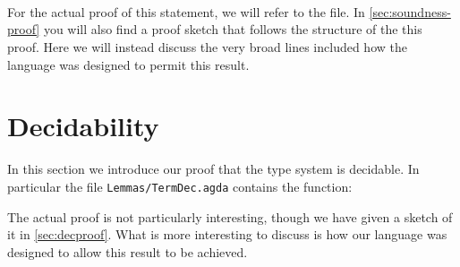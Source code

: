 \begin{code}
\> \AgdaSymbol{:}  \AgdaSymbol{\{}  \AgdaSymbol{\}} \<%
\\
\>[2]\<[20]%
\>[20]   \<%
\\
\>[2]\<[20]%
\>[20]    \AgdaFunction{/}  \<%
\\
\>[2]\<[20]%
\>[20] \<%
\end{code}

For the actual proof of this statement, we will refer to the file. In
\cref{sec:soundness-proof} you will also find a proof sketch that follows the
structure of the this proof. Here we will instead discuss the very broad lines
included how the language was designed to permit this result.


\section{Decidability}

In this section we introduce our proof that the type system is decidable. In
particular the file \texttt{Lemmas/TermDec.agda} contains the function:

\begin{code}
\> \AgdaSymbol{:}     \AgdaSymbol{(}  \AgdaSymbol{)}\<%
\end{code}

The actual proof is not particularly interesting, though we have given a sketch
of it in \cref{sec:decproof}. What is more interesting to discuss is how our
language was designed to allow this result to be achieved.

